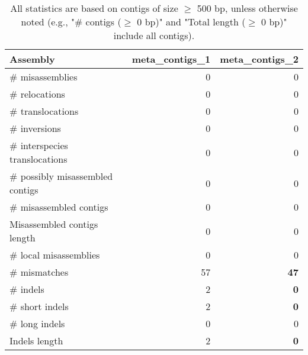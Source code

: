 \documentclass[12pt,a4paper]{article}
\begin{document}
\begin{table}[ht]
\begin{center}
\caption{All statistics are based on contigs of size $\geq$ 500 bp, unless otherwise noted (e.g., "\# contigs ($\geq$ 0 bp)" and "Total length ($\geq$ 0 bp)" include all contigs).}
\begin{tabular}{|l*{2}{|r}|}
\hline
Assembly & meta\_contigs\_1 & meta\_contigs\_2 \\ \hline
\# misassemblies & 0 & 0 \\ \hline
\hspace{5mm}\# relocations & 0 & 0 \\ \hline
\hspace{5mm}\# translocations & 0 & 0 \\ \hline
\hspace{5mm}\# inversions & 0 & 0 \\ \hline
\hspace{5mm}\# interspecies translocations & 0 & 0 \\ \hline
\# possibly misassembled contigs & 0 & 0 \\ \hline
\# misassembled contigs & 0 & 0 \\ \hline
Misassembled contigs length & 0 & 0 \\ \hline
\# local misassemblies & 0 & 0 \\ \hline
\# mismatches & 57 & {\bf 47} \\ \hline
\# indels & 2 & {\bf 0} \\ \hline
\hspace{5mm}\# short indels & 2 & {\bf 0} \\ \hline
\hspace{5mm}\# long indels & 0 & 0 \\ \hline
Indels length & 2 & {\bf 0} \\ \hline
\end{tabular}
\end{center}
\end{table}
\end{document}
